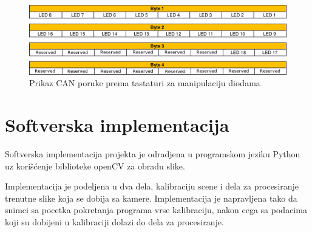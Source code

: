 \documentclass[a4paper,12pt, projekat]{etf}
\begin{document}
        \begin{figure}[htb]
            \centering
            \includegraphics[scale=0.3]{canmsg.png}
            \caption{Prikaz CAN poruke prema tastaturi za manipulaciju diodama}
            \label{fig:keyboardmsg}
        \end{figure}

        \chapter{Softverska implementacija}
        Softverska implementacija projekta je odradjena u programskom jeziku
        Python uz kori\v{s}\'{c}enje biblioteke openCV za obradu slike.

        Implementacija je podeljena u dva dela, kalibraciju scene i dela za
        procesiranje trenutne slike koja se dobija sa kamere. Implementacija je
        napravljena tako da snimci sa pocetka pokretanja programa vrse
        kalibraciju, nakon cega sa podacima koji su dobijeni u kalibraciji
        dolazi do dela za procesiranje.
\end{document}
